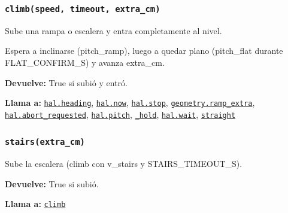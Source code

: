 \subsubsection{\texttt{climb(speed, timeout, extra\_\allowbreak{}cm)}}\label{fn:motion:climb}
\noindent Sube una rampa o escalera y entra completamente al nivel.

Espera a inclinarse (pitch\_ramp), luego a quedar plano (pitch\_flat durante FLAT\_CONFIRM\_S) y avanza extra\_cm.

\par{}\par\smallskip
\noindent\textbf{Devuelve:} True si subió y entró.\par
\noindent\textbf{Llama a:} \hyperref[fn:hal:heading]{\texttt{hal.heading}}, \hyperref[fn:hal:now]{\texttt{hal.now}}, \hyperref[fn:hal:stop]{\texttt{hal.stop}}, \hyperref[fn:geometry:ramp-extra]{\texttt{geometry.ramp\_\allowbreak{}extra}}, \hyperref[fn:hal:abort-requested]{\texttt{hal.abort\_\allowbreak{}requested}}, \hyperref[fn:hal:pitch]{\texttt{hal.pitch}}, \hyperref[fn:motion:-hold]{\texttt{\_\allowbreak{}hold}}, \hyperref[fn:hal:wait]{\texttt{hal.wait}}, \hyperref[fn:motion:straight]{\texttt{straight}}\par

\subsubsection{\texttt{stairs(extra\_\allowbreak{}cm)}}\label{fn:motion:stairs}
\noindent Sube la escalera (climb con v\_stairs y STAIRS\_TIMEOUT\_S).

\par{}\par\smallskip
\noindent\textbf{Devuelve:} True si subió.\par
\noindent\textbf{Llama a:} \hyperref[fn:motion:climb]{\texttt{climb}}\par

